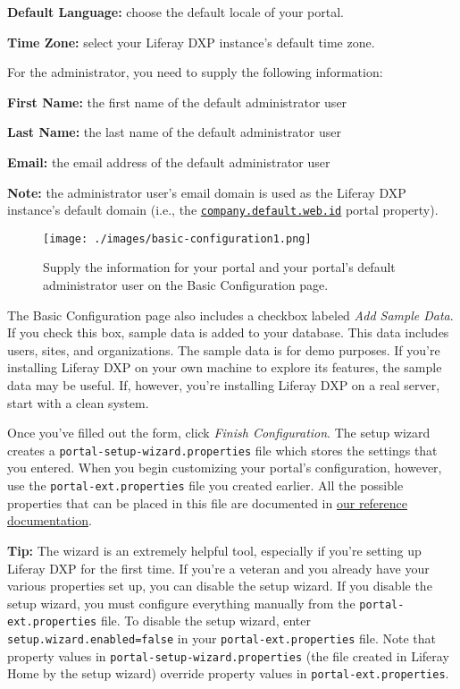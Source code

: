 \textbf{Default Language:} choose the default locale of your portal.

\textbf{Time Zone:} select your Liferay DXP instance's default time
zone.

For the administrator, you need to supply the following information:

\textbf{First Name:} the first name of the default administrator user

\textbf{Last Name:} the last name of the default administrator user

\textbf{Email:} the email address of the default administrator user

\noindent\hrulefill

\textbf{Note:} the administrator user's email domain is used as the
Liferay DXP instance's default domain (i.e., the
\href{https://docs.liferay.com/dxp/portal/7.1-latest/propertiesdoc/portal.properties.html\#Company}{\texttt{company.default.web.id}}
portal property).

\noindent\hrulefill

\begin{figure}
\centering
\texttt{[image: ./images/basic-configuration1.png]}
\caption{Supply the information for your portal and your portal's
default administrator user on the Basic Configuration page.}
\end{figure}

The Basic Configuration page also includes a checkbox labeled \emph{Add
Sample Data}. If you check this box, sample data is added to your
database. This data includes users, sites, and organizations. The sample
data is for demo purposes. If you're installing Liferay DXP on your own
machine to explore its features, the sample data may be useful. If,
however, you're installing Liferay DXP on a real server, start with a
clean system.

Once you've filled out the form, click \emph{Finish Configuration}. The
setup wizard creates a \texttt{portal-setup-wizard.properties} file
which stores the settings that you entered. When you begin customizing
your portal's configuration, however, use the
\texttt{portal-ext.properties} file you created earlier. All the
possible properties that can be placed in this file are documented in
\href{http://docs.liferay.com/portal/7.0/propertiesdoc}{our reference
documentation}.

\noindent\hrulefill

\textbf{Tip:} The wizard is an extremely helpful tool, especially if
you're setting up Liferay DXP for the first time. If you're a veteran
and you already have your various properties set up, you can disable the
setup wizard. If you disable the setup wizard, you must configure
everything manually from the \texttt{portal-ext.properties} file. To
disable the setup wizard, enter \texttt{setup.wizard.enabled=false} in
your \texttt{portal-ext.properties} file. Note that property values in
\texttt{portal-setup-wizard.properties} (the file created in Liferay
Home by the setup wizard) override property values in
\texttt{portal-ext.properties}.

